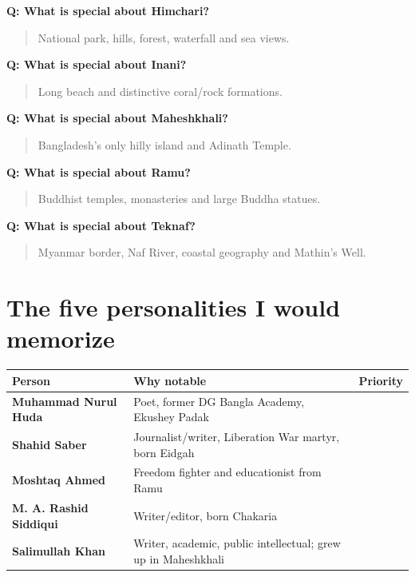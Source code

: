 \textbf{Q: What is special about Himchari?}

\begin{quote}
National park, hills, forest, waterfall and sea views.\\
\end{quote}

\textbf{Q: What is special about Inani?}

\begin{quote}
Long beach and distinctive coral/rock formations.\\
\end{quote}

\textbf{Q: What is special about Maheshkhali?}

\begin{quote}
Bangladesh's only hilly island and Adinath Temple.\\
\end{quote}

\textbf{Q: What is special about Ramu?}

\begin{quote}
Buddhist temples, monasteries and large Buddha statues.\\
\end{quote}

\textbf{Q: What is special about Teknaf?}

\begin{quote}
Myanmar border, Naf River, coastal geography and Mathin's Well.\\
\end{quote}

\medskip

\section{The five personalities I would memorize}

\begin{center}
\setlength{\tabcolsep}{6pt}
\renewcommand{\arraystretch}{1.2}
\begin{tabular}{|l|l|l|}
\hline
\textbf{Person} & \textbf{Why notable} & \textbf{Priority} \\
\hline
\textbf{Muhammad Nurul Huda} & Poet, former DG Bangla Academy, Ekushey Padak &  \\
\textbf{Shahid Saber} & Journalist/writer, Liberation War martyr, born Eidgah &  \\
\textbf{Moshtaq Ahmed} & Freedom fighter and educationist from Ramu &  \\
\textbf{M. A. Rashid Siddiqui} & Writer/editor, born Chakaria &  \\
\textbf{Salimullah Khan} & Writer, academic, public intellectual; grew up in Maheshkhali &  \\
\hline
\end{tabular}
\end{center}

